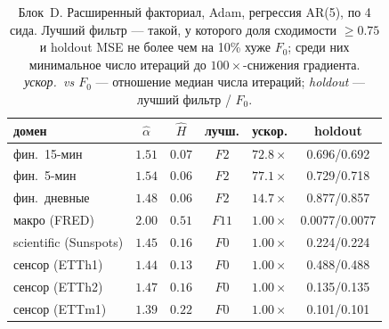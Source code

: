 \begin{table}[t]
\caption{Блок~D. Расширенный факториал, Adam, регрессия AR(5), по 4 сида. Лучший фильтр --- такой, у которого доля сходимости $\ge 0.75$ и holdout MSE не более чем на 10\% хуже $F_0$; среди них минимальное число итераций до $100\times$-снижения градиента. \emph{ускор.\ vs $F_0$} --- отношение медиан числа итераций; \emph{holdout} --- лучший фильтр / $F_0$.}
\label{tab:blockD}
\centering\begin{tabular}{lccccc}
\toprule
домен & $\hat\alpha$ & $\hat H$ & лучш. & ускор. & holdout\\
\midrule
фин.\ 15-мин & $1.51$ & $0.07$ & $F2$ & $\mathbf{72.8\times}$ & 0.696/0.692\\
фин.\ 5-мин & $1.54$ & $0.06$ & $F2$ & $\mathbf{77.1\times}$ & 0.729/0.718\\
фин.\ дневные & $1.48$ & $0.06$ & $F2$ & $\mathbf{14.7\times}$ & 0.877/0.857\\
макро (FRED) & $2.00$ & $0.51$ & $F11$ & $1.00\times$ & 0.0077/0.0077\\
scientific (Sunspots) & $1.45$ & $0.16$ & $F0$ & $1.00\times$ & 0.224/0.224\\
сенсор (ETTh1) & $1.44$ & $0.13$ & $F0$ & $1.00\times$ & 0.488/0.488\\
сенсор (ETTh2) & $1.47$ & $0.16$ & $F0$ & $1.00\times$ & 0.135/0.135\\
сенсор (ETTm1) & $1.39$ & $0.22$ & $F0$ & $1.00\times$ & 0.101/0.101\\
\bottomrule
\end{tabular}\end{table}
